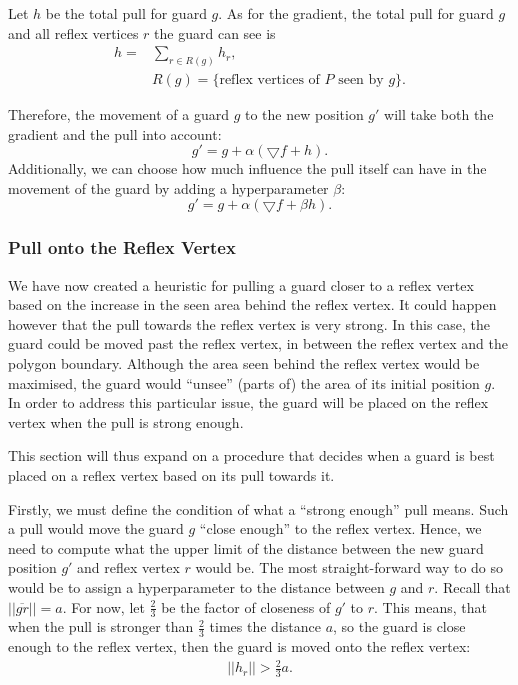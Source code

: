 Let $h$ be the total pull for guard $g$. As for the gradient, the total pull for guard $g$ and all reflex vertices $r$ the guard can see is 
\begin{align*}
    h = &\sum_{r \in R(g)} h_r, \\
    &R(g) = \{\text{reflex vertices of $P$ seen by $g$\}}.
\end{align*}

Therefore, the movement of a guard $g$ to the new position $g'$ will take both the gradient and the pull into account: $$g' = g + \alpha (\bigtriangledown f + h).$$ Additionally, we can choose how much influence the pull itself can have in the movement of the guard by adding a hyperparameter $\beta$: $$g' = g + \alpha (\bigtriangledown f + \beta h).$$

\subsubsection{Pull onto the Reflex Vertex}
We have now created a heuristic for pulling a guard closer to a reflex vertex based on the increase in the seen area behind the reflex vertex. It could happen however that the pull towards the reflex vertex is very strong. In this case, the guard could be moved past the reflex vertex, in between the reflex vertex and the polygon boundary. Although the area seen behind the reflex vertex would be maximised, the guard would ``unsee'' (parts of) the area of its initial position $g$. In order to address this particular issue, the guard will be placed on the reflex vertex when the pull is strong enough. 

This section will thus expand on a procedure that decides when a guard is best placed on a reflex vertex based on its pull towards it.

Firstly, we must define the condition of what a ``strong enough'' pull means. Such a pull would move the guard $g$ ``close enough'' to the reflex vertex. Hence, we need to compute what the upper limit of the distance between the new guard position $g'$ and reflex vertex $r$ would be. The most straight-forward way to do so would be to assign a hyperparameter to the distance between $g$ and $r$. Recall that $||\overline{gr}|| = a$. For now, let $\frac 2 3$ be the factor of closeness of $g'$ to $r$. This means, that when the pull is stronger than $\frac 2 3$ times the distance $a$, so the guard is close enough to the reflex vertex, then the guard is moved onto the reflex vertex: 
\begin{align}
    ||h_r|| > \frac 2 3 a. \label{eq:h_a}
\end{align}



